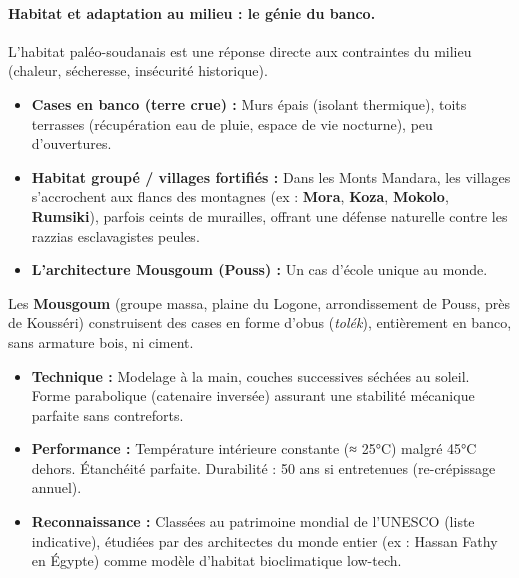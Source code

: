 \documentclass[11pt]{article}
\begin{document}
\paragraph{Habitat et adaptation au milieu : le génie du banco.}
L'habitat paléo-soudanais est une réponse directe aux contraintes du milieu (chaleur, sécheresse, insécurité historique).
\begin{itemize}
    \item \textbf{Cases en banco (terre crue) :} Murs épais (isolant thermique), toits terrasses (récupération eau de pluie, espace de vie nocturne), peu d'ouvertures.
    \item \textbf{Habitat groupé / villages fortifiés :} Dans les Monts Mandara, les villages s'accrochent aux flancs des montagnes (ex : \textbf{Mora}, \textbf{Koza}, \textbf{Mokolo}, \textbf{Rumsiki}), parfois ceints de murailles, offrant une défense naturelle contre les razzias esclavagistes peules.
    \item \textbf{L'architecture Mousgoum (Pouss) :} Un cas d'école unique au monde.
\end{itemize}

\begin{savaistu}
Les \textbf{Mousgoum} (groupe massa, plaine du Logone, arrondissement de Pouss, près de Kousséri) construisent des cases en forme d'obus (\emph{tolék}), entièrement en banco, sans armature bois, ni ciment.
\begin{itemize}
    \item \textbf{Technique :} Modelage à la main, couches successives séchées au soleil. Forme parabolique (catenaire inversée) assurant une stabilité mécanique parfaite sans contreforts.
    \item \textbf{Performance :} Température intérieure constante (≈ 25°C) malgré 45°C dehors. Étanchéité parfaite. Durabilité : 50 ans si entretenues (re-crépissage annuel).
    \item \textbf{Reconnaissance :} Classées au patrimoine mondial de l'UNESCO (liste indicative), étudiées par des architectes du monde entier (ex : Hassan Fathy en Égypte) comme modèle d'habitat bioclimatique low-tech.
\end{itemize}
\end{savaistu}
\end{document}
